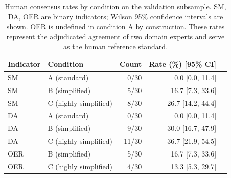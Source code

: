 \begin{table}[H]
\caption{Human consensus rates by condition on the validation subsample. SM, DA, OER are binary indicators; Wilson 95\% confidence intervals are shown. OER is undefined in condition A by construction. These rates represent the adjudicated agreement of two domain experts and serve as the human reference standard.}
\label{tab:reviewer:consensus}
\centering
\begin{tabular}{llrrr}
\toprule
Indicator & Condition & Count & Rate (\%) [95\% CI] \\
\midrule
SM & A (standard) & 0/30 & 0.0 [0.0, 11.4] \\
SM & B (simplified) & 5/30 & 16.7 [7.3, 33.6] \\
SM & C (highly simplified) & 8/30 & 26.7 [14.2, 44.4] \\
DA & A (standard) & 0/30 & 0.0 [0.0, 11.4] \\
DA & B (simplified) & 9/30 & 30.0 [16.7, 47.9] \\
DA & C (highly simplified) & 11/30 & 36.7 [21.9, 54.5] \\
OER & B (simplified) & 5/30 & 16.7 [7.3, 33.6] \\
OER & C (highly simplified) & 4/30 & 13.3 [5.3, 29.7] \\
\bottomrule
\end{tabular}
\end{table}
